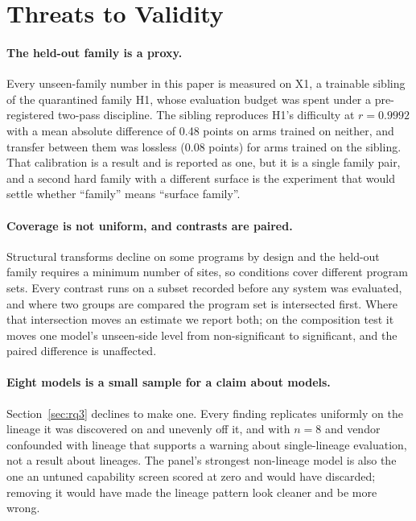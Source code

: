 \section{Threats to Validity}

\paragraph{The held-out family is a proxy.} Every unseen-family number in this paper is measured on
X1, a trainable sibling of the quarantined family H1, whose evaluation budget was spent under a
pre-registered two-pass discipline. The sibling reproduces H1's difficulty at $r = 0.9992$ with a
mean absolute difference of 0.48 points on arms trained on neither, and transfer between them was
lossless (0.08 points) for arms trained on the sibling. That calibration is a result and is reported
as one, but it is a single family pair, and a second hard family with a different surface is the
experiment that would settle whether ``family'' means ``surface family''.

\paragraph{Coverage is not uniform, and contrasts are paired.} Structural transforms decline on
some programs by design and the held-out family requires a minimum number of sites, so conditions
cover different program sets. Every contrast runs on a subset recorded before any system was
evaluated, and where two groups are compared the program set is intersected first. Where that
intersection moves an estimate we report both; on the composition test it moves one model's
unseen-side level from non-significant to significant, and the paired difference is unaffected.

\paragraph{Eight models is a small sample for a claim about models.} Section~\ref{sec:rq3} declines
to make one. Every finding replicates uniformly on the lineage it was discovered on and unevenly off
it, and with $n = 8$ and vendor confounded with lineage that supports a warning about
single-lineage evaluation, not a result about lineages. The panel's strongest non-lineage model is
also the one an untuned capability screen scored at zero and would have discarded; removing it
would have made the lineage pattern look cleaner and be more wrong.

